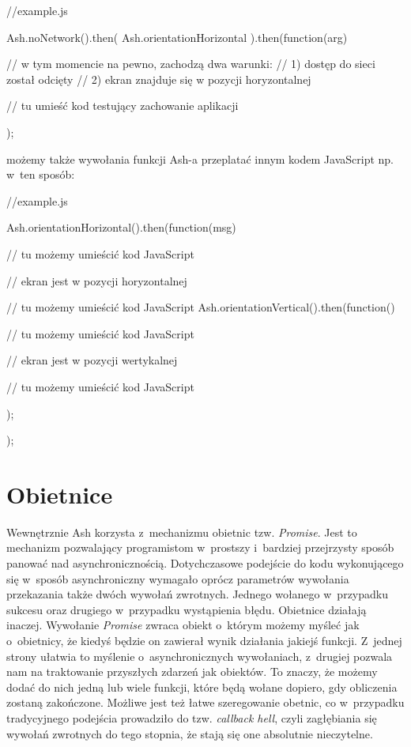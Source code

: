\documentclass[brudnopis]{xmgr}
\begin{document}
\begin{javascriptcode}
    //example.js

    Ash.noNetwork().then(
	    Ash.orientationHorizontal
    ).then(function(arg){
      	//  w tym momencie na pewno, zachodzą dwa warunki: 
      	//  1) dostęp do sieci został odcięty  
      	//  2) ekran znajduje się w pozycji horyzontalnej 

      	// tu umieść kod testujący zachowanie aplikacji  
    });
\end{javascriptcode}

możemy także wywołania funkcji Ash-a przeplatać innym kodem JavaScript np. w~ten sposób:

\begin{javascriptcode}
    //example.js

    Ash.orientationHorizontal().then(function(msg){
	//  tu możemy umieścić kod JavaScript 
      	
	// ekran jest w pozycji horyzontalnej
      
	//  tu możemy umieścić kod JavaScript 
      	Ash.orientationVertical().then(function(){
		//  tu możemy umieścić kod JavaScript 

		// ekran jest w pozycji wertykalnej 

		//  tu możemy umieścić kod JavaScript 
      	});
    });
\end{javascriptcode}

\section{Obietnice}\label{promise}

Wewnętrznie Ash korzysta z~mechanizmu obietnic tzw. \textit{Promise}. Jest to mechanizm pozwalający programistom w~prostszy i~bardziej przejrzysty sposób panować nad asynchronicznością. Dotychczasowe podejście do kodu wykonującego się w~sposób asynchroniczny wymagało oprócz parametrów wywołania przekazania także dwóch wywołań zwrotnych. Jednego wołanego w~przypadku sukcesu oraz drugiego w~przypadku wystąpienia błędu. Obietnice działają inaczej. Wywołanie \textit{Promise} zwraca obiekt o~którym możemy myśleć jak o~obietnicy, że kiedyś będzie on zawierał wynik działania jakiejś funkcji. Z~jednej strony ułatwia to myślenie o~asynchronicznych wywołaniach, z~drugiej pozwala nam na traktowanie przyszłych zdarzeń jak obiektów. To znaczy, że możemy dodać do nich jedną lub wiele funkcji, które będą wołane dopiero, gdy obliczenia zostaną zakończone. Możliwe jest też łatwe szeregowanie obetnic, co w~przypadku tradycyjnego podejścia prowadziło do tzw. \textit{callback hell}, czyli zagłębiania się wywołań zwrotnych do tego stopnia, że stają się one absolutnie nieczytelne. 
\end{document}
